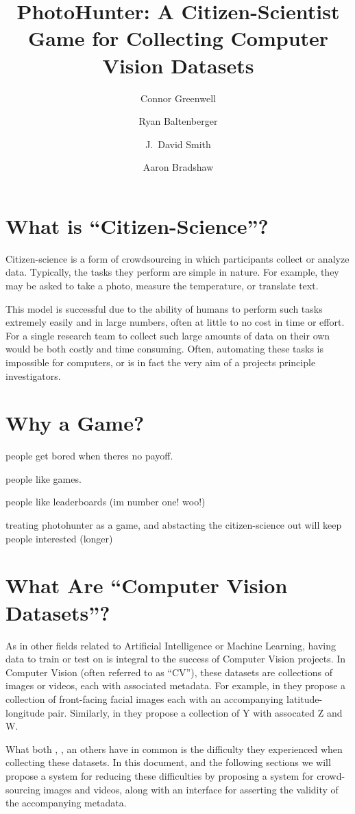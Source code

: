\documentclass{article}
\title{PhotoHunter: A Citizen-Scientist Game for Collecting Computer 
Vision Datasets}
\author{Connor Greenwell \and Ryan Baltenberger 
  \and J.\ David Smith \and Aaron Bradshaw}
\begin{document}
\maketitle

\section{What is ``Citizen-Science''?}

Citizen-science is a form of crowdsourcing in which participants
collect or analyze data. Typically, the tasks they perform are simple
in nature. For example, they may be asked to take a photo, measure the 
temperature, or translate text.

This model is successful due to the ability of humans to perform such
tasks extremely easily and in large numbers, often at little to no
cost in time or effort. For a single research team to collect such
large amounts of data on their own would be both costly and time
consuming. Often, automating these tasks is impossible for computers,
or is in fact the very aim of a projects principle investigators.

\section{Why a Game?}

people get bored when theres no payoff.

people like games. 

people like leaderboards (im number one! woo!)

treating photohunter as a game, and abstacting the citizen-science out
will keep people interested (longer)

\section{What Are ``Computer Vision Datasets''?}

As in other fields related to Artificial Intelligence or Machine
Learning, having data to train or test on is integral to the success
of Computer Vision projects. In Computer Vision (often referred to as 
``CV''), these datasets are collections of images or videos, each with
associated metadata. For example, in \cite{islam2014geofaces} they
propose a collection of front-facing facial images each with an
accompanying latitude-longitude pair. Similarly, in \cite{X} they
propose a collection of Y with assocated Z and W.

What both \cite{islam2014geofaces}, \cite{X}, an others have in common
is the difficulty they experienced when collecting these datasets. In
this document, and the following sections we will propose a system for
reducing these difficulties by proposing a system for crowd-sourcing
images and videos, along with an interface for asserting the validity
of the accompanying metadata.
\end{document}
